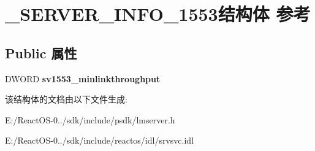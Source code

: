 \hypertarget{struct___s_e_r_v_e_r___i_n_f_o__1553}{}\section{\+\_\+\+S\+E\+R\+V\+E\+R\+\_\+\+I\+N\+F\+O\+\_\+1553结构体 参考}
\label{struct___s_e_r_v_e_r___i_n_f_o__1553}
\subsection*{Public 属性}
\begin{DoxyCompactItemize}
\item 
\mbox{\label{struct___s_e_r_v_e_r___i_n_f_o__1553_abbd335c50b4a90901f43bc7b70ac4779}} 
D\+W\+O\+RD {\bfseries sv1553\+\_\+minlinkthroughput}
\end{DoxyCompactItemize}


该结构体的文档由以下文件生成\+:\begin{DoxyCompactItemize}
\item 
E\+:/\+React\+O\+S-\/0../sdk/include/psdk/lmserver.\+h\item 
E\+:/\+React\+O\+S-\/0../sdk/include/reactos/idl/srvsvc.\+idl\end{DoxyCompactItemize}
